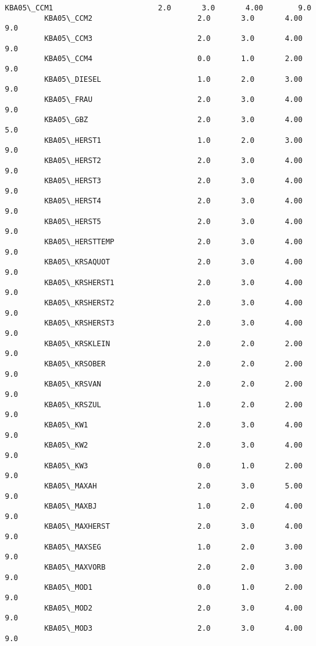 \documentclass[11pt]{article}
\begin{document}
\begin{Verbatim}[commandchars=\\\{\}]
         KBA05\_CCM1                        2.0       3.0       4.00        9.0  
         KBA05\_CCM2                        2.0       3.0       4.00        9.0  
         KBA05\_CCM3                        2.0       3.0       4.00        9.0  
         KBA05\_CCM4                        0.0       1.0       2.00        9.0  
         KBA05\_DIESEL                      1.0       2.0       3.00        9.0  
         KBA05\_FRAU                        2.0       3.0       4.00        9.0  
         KBA05\_GBZ                         2.0       3.0       4.00        5.0  
         KBA05\_HERST1                      1.0       2.0       3.00        9.0  
         KBA05\_HERST2                      2.0       3.0       4.00        9.0  
         KBA05\_HERST3                      2.0       3.0       4.00        9.0  
         KBA05\_HERST4                      2.0       3.0       4.00        9.0  
         KBA05\_HERST5                      2.0       3.0       4.00        9.0  
         KBA05\_HERSTTEMP                   2.0       3.0       4.00        9.0  
         KBA05\_KRSAQUOT                    2.0       3.0       4.00        9.0  
         KBA05\_KRSHERST1                   2.0       3.0       4.00        9.0  
         KBA05\_KRSHERST2                   2.0       3.0       4.00        9.0  
         KBA05\_KRSHERST3                   2.0       3.0       4.00        9.0  
         KBA05\_KRSKLEIN                    2.0       2.0       2.00        9.0  
         KBA05\_KRSOBER                     2.0       2.0       2.00        9.0  
         KBA05\_KRSVAN                      2.0       2.0       2.00        9.0  
         KBA05\_KRSZUL                      1.0       2.0       2.00        9.0  
         KBA05\_KW1                         2.0       3.0       4.00        9.0  
         KBA05\_KW2                         2.0       3.0       4.00        9.0  
         KBA05\_KW3                         0.0       1.0       2.00        9.0  
         KBA05\_MAXAH                       2.0       3.0       5.00        9.0  
         KBA05\_MAXBJ                       1.0       2.0       4.00        9.0  
         KBA05\_MAXHERST                    2.0       3.0       4.00        9.0  
         KBA05\_MAXSEG                      1.0       2.0       3.00        9.0  
         KBA05\_MAXVORB                     2.0       2.0       3.00        9.0  
         KBA05\_MOD1                        0.0       1.0       2.00        9.0  
         KBA05\_MOD2                        2.0       3.0       4.00        9.0  
         KBA05\_MOD3                        2.0       3.0       4.00        9.0  

\end{Verbatim}
\end{document}
